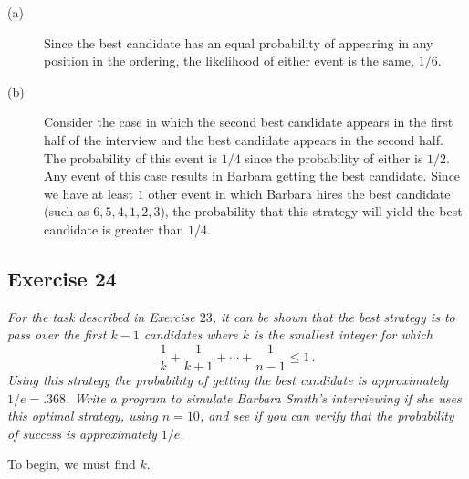 \documentclass{tufte-handout}
\begin{document}
\begin{description}
\item[\rm (a)] Since the best candidate has an equal probability of
  appearing in any position in the ordering, the likelihood of either
  event is the same, $1/6$.
\item[\rm (b)] Consider the case in which the second best candidate
  appears in the first half of the interview and the best candidate
  appears in the second half. The probability of this event is $1/4$
  since the probability of either is $1/2$. Any event of this case
  results in Barbara getting the best candidate. Since we have at
  least $1$ other event in which Barbara hires the best candidate
  (such as $6,5,4,1,2,3$), the probability that this strategy will
  yield the best candidate is greater than $1/4$.
\end{description}

\subsection{Exercise 24}
\begin{description}
\item \emph{For the task described in Exercise $23$, it can be shown
    that the best strategy is to pass over the first $k-1$ candidates
    where $k$ is the smallest integer for which}
  \[\frac{1}{k} + \frac{1}{k+1} + \cdots + \frac{1}{n-1} \leq 1 \, .\]
  \emph{Using this strategy the probability of getting the best
    candidate is approximately $1/e = .368$. Write a program to
    simulate Barbara Smith's interviewing if she uses this optimal
    strategy, using $n=10$, and see if you can verify that the
    probability of success is approximately $1/e$.}
\end{description}

To begin, we must find $k$.
\begin{align*}

\end{align*}
\end{document}
